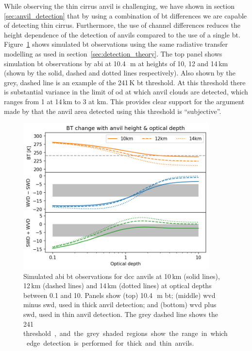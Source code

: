 While observing the thin cirrus anvil is challenging, we have shown in section \ref{sec:anvil_detection} that by using a combination of \acrshort{bt} differences we are capable of detecting thin cirrus.
Furthermore, the use of channel differences reduces the height dependence of the detection of anvils compared to the use of a single \acrshort{bt}.
Figure~\ref{fig:bt_wvd_swd_height_od} shows simulated \acrshort{bt} observations using the same radiative transfer modelling as used in section~\ref{sec:detection_theory}.
The top panel shows simulation \acrshort{bt} observations by \acrshort{abi} at 10.4\,\unit{\mu m} at heights of 10, 12 and 14\,\unit{km} (shown by the solid, dashed and dotted lines respectively).
Also shown by the grey, dashed line is an example of the 241\,\unit{K} \acrshort{bt} threshold.
At this threshold there is substantial variance in the limit of \acrshort{od} at which anvil clouds are detected, which ranges from 1 at 14\,\unit{km} to 3 at \unit{km}.
This provides clear support for the argument made by \citet{augustine_mesoscale_1988} that the anvil area detected using this threshold is ``subjective''.

\begin{figure}[tp]
    \centering
    \includegraphics[width=0.9\textwidth]{figures/bt_wvd_swd_height_od.png}
    \caption[
    Simulated \acrshort{abi} \acrshort{bt} observations of \acrshort{dcc} anvils for different optical depths and heights.
    ]{
    Simulated \acrshort{abi} \acrshort{bt} observations for \acrshort{dcc} anvils at 10\,\unit{km} (solid lines), 12\,\unit{km} (dashed lines) and 14\,\unit{km} (dotted lines) at optical depths between 0.1 and 10. Panels show (top) 10.4\,\unit{\mu m} \acrshort{bt}; (middle) \acrshort{wvd} minus \acrshort{swd}, used in thick anvil detection; and (bottom) \acrshort{wvd} plus \acrshort{swd}, used in thin anvil detection. The grey dashed line shows the 241\,\unit[K] threshold, and the grey shaded regions show the range in which edge detection is performed for thick and thin anvils.
    }
    \label{fig:bt_wvd_swd_height_od}
\end{figure}

